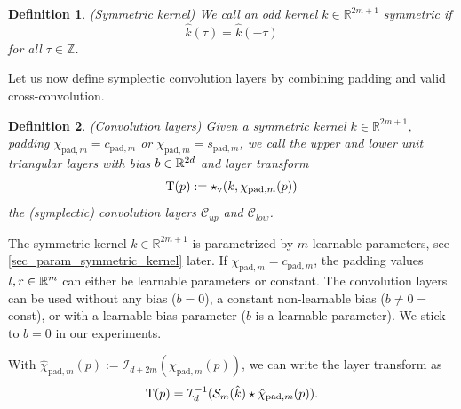 \documentclass[twoside,a4paper]{article}
\newtheorem{definition}{Definition}
\begin{document}
\begin{definition}
	(Symmetric kernel)
	We call an odd kernel $k \in \mathbb{R}^{2m+1}$ symmetric if
	\begin{equation*}
		\hat{k}(\tau) = \hat{k}(-\tau)
	\end{equation*}
	for all $\tau \in \mathbb{Z}$.
\end{definition}

Let us now define symplectic convolution layers by combining padding and valid 
cross-convolution.
\begin{definition}\label{def_conv_layer}
	(Convolution layers)
	Given a symmetric kernel $k \in \mathbb{R}^{2m+1}$, padding
	$\chi_{\text{pad},m} = c_{\text{pad},m}$ or $\chi_{\text{pad},m} = s_{\text{pad},m}$,
	we call the upper and lower unit triangular layers with bias $b \in \mathbb{R}^{2d}$ and layer transform
	\begin{equation*}
		\mathrm{T}(p) := \star_{\text{v}}(k,\chi_{\text{pad},m}(p))
	\end{equation*}
	the (symplectic) convolution layers $\mathcal{C}_{up}$ and $\mathcal{C}_{low}$.
\end{definition}
The symmetric kernel $k \in \mathbb{R}^{2m+1}$ is parametrized by $m$ learnable parameters, 
see \cref{sec_param_symmetric_kernel} later.
If $\chi_{\text{pad},m} = c_{\text{pad},m}$, the padding values $l,r \in \mathbb{R}^m$ can either
be learnable parameters or constant. The convolution layers can be used without any bias ($b=0$), a
constant non-learnable bias ($b \neq 0 =$ const), or with a learnable bias parameter 
($b$ is a learnable parameter). We stick to $b=0$ in our experiments.

With $\hat{\chi}_{\text{pad},m}(p) := \mathcal{I}_{d+2m}(\chi_{\text{pad},m}(p))$,
we can write the layer transform as
\begin{equation}\label{eq_conv_layer_transform}
	\mathrm{T}(p) =
	\mathcal{I}_{d}^{-1} (
		\mathcal{S}_{m}(\hat{k}) \star \hat{\chi}_{\text{pad},m}(p)
	)
	.
\end{equation}
\end{document}
